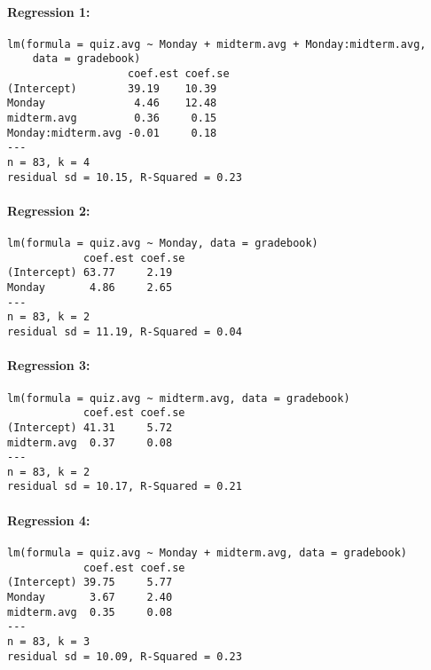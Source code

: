 \documentclass[addpoints,12pt]{exam}
\begin{document}
\begin{table}
\footnotesize
\caption{Regression Results}
\label{tab:regression}

\paragraph{Regression 1:}
\begin{verbatim}
lm(formula = quiz.avg ~ Monday + midterm.avg + Monday:midterm.avg, 
    data = gradebook)
                   coef.est coef.se
(Intercept)        39.19    10.39  
Monday              4.46    12.48  
midterm.avg         0.36     0.15  
Monday:midterm.avg -0.01     0.18  
---
n = 83, k = 4
residual sd = 10.15, R-Squared = 0.23
\end{verbatim}

\paragraph{Regression 2:}
\begin{verbatim}
lm(formula = quiz.avg ~ Monday, data = gradebook)
            coef.est coef.se
(Intercept) 63.77     2.19  
Monday       4.86     2.65  
---
n = 83, k = 2
residual sd = 11.19, R-Squared = 0.04

\end{verbatim}

\paragraph{Regression 3:}
\begin{verbatim}
lm(formula = quiz.avg ~ midterm.avg, data = gradebook)
            coef.est coef.se
(Intercept) 41.31     5.72  
midterm.avg  0.37     0.08  
---
n = 83, k = 2
residual sd = 10.17, R-Squared = 0.21
\end{verbatim}

\paragraph{Regression 4:}
\begin{verbatim}
lm(formula = quiz.avg ~ Monday + midterm.avg, data = gradebook)
            coef.est coef.se
(Intercept) 39.75     5.77  
Monday       3.67     2.40  
midterm.avg  0.35     0.08  
---
n = 83, k = 3
residual sd = 10.09, R-Squared = 0.23
\end{verbatim}

\end{table}
\end{document}
